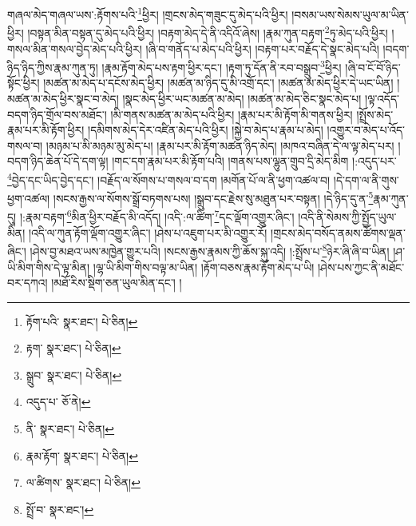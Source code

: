 གཞལ་མེད་གཞལ་ཡས་:རྟོགས་པའི་\footnote{རྟོག་པའི་  སྣར་ཐང་།  པེ་ཅིན། }ཕྱིར། །གྲངས་མེད་གཟུང་དུ་མེད་པའི་ཕྱིར། །བསམ་ཡས་སེམས་ཡུལ་མ་ཡིན་ཕྱིར། །བསྟན་མིན་བསྟན་དུ་མེད་པའི་ཕྱིར། །བརྟག་མེད་དེ་ནི་འདིའོ་ཞེས། །རྣམ་ཀུན་བརྟག་\footnote{རྟག་  སྣར་ཐང་།  པེ་ཅིན། }ཏུ་མེད་པའི་ཕྱིར། །གསལ་མིན་གསལ་བྱེད་མེད་པའི་ཕྱིར། །ཞི་བ་གནོད་པ་མེད་པའི་ཕྱིར། །བརྟག་པར་བརྗོད་དེ་སྣང་མེད་པའི། །བདག་ཉིད་ཉིད་ཀྱིས་རྣམ་ཀུན་ཏུ། །རྣམ་རྟོག་མེད་པས་རྟག་ཕྱིར་དང་། །རྟག་ཏུ་དོན་ནི་རབ་བསྒྲུབ་\footnote{སྒྲུབ་  སྣར་ཐང་།  པེ་ཅིན། }ཕྱིར། །ཞི་བ་ངོ་བོ་ཉིད་སྟོང་ཕྱིར། །མཚན་མ་མེད་པ་དངོས་མེད་ཕྱིར། །མཚན་མ་ཉིད་དུ་མི་འགྲོ་དང་། །མཚན་མ་མེད་ཕྱིར་དེ་ཡང་ཡིན། །མཚན་མ་མེད་ཕྱིར་སྣང་བ་མེད། །སྣང་མེད་ཕྱིར་ཡང་མཚན་མ་མེད། །མཚན་མ་མེད་ཅིང་སྣང་མེད་པ། །ལྟ་འདོད་བདག་ཉིད་གྲོལ་བས་མཐོང་། །མི་གནས་མཚན་མ་མེད་པའི་ཕྱིར། །རྣམ་པར་མི་རྟོག་མི་གནས་ཕྱིར། །སྤྲོས་མེད་རྣམ་པར་མི་རྟོག་ཕྱིར། །དམིགས་མེད་དེར་འཛིན་མེད་པའི་ཕྱིར། །སྐྱེ་བ་མེད་པ་རྣམ་པ་མེད། །འགྱུར་བ་མེད་པ་འོད་གསལ་བ། །མཉམ་པ་མི་མཉམ་མུ་མེད་པ། །རྣམ་པར་མི་རྟོག་མཚན་ཉིད་མེད། །མཁའ་བཞིན་དེ་ལ་ལྟ་མེད་པར། །བདག་ཉིད་ཆེན་པོ་དེ་དག་ལྟ། །གང་དག་རྣམ་པར་མི་རྟོག་པའི། །གནས་པས་ལྷུན་གྲུབ་དྲི་མེད་མིག །:འདུད་པར་\footnote{འདུད་པ་  ཅོ་ནེ། }བྱེད་དང་ཡིད་བྱེད་དང་། །བརྗོད་ལ་སོགས་པ་གསལ་བ་དག །མགོན་པོ་ལ་ནི་ཕྱག་འཚལ་བ། །དེ་དག་ལ་ནི་གུས་ཕྱག་འཚལ། །སངས་རྒྱས་ལ་སོགས་སྒྲོ་བཏགས་པས། །སྒྲུབ་དང་རྗེས་སུ་མཐུན་པར་བསྟན། །དེ་ཉིད་དུ་ན་\footnote{ནི་  སྣར་ཐང་།  པེ་ཅིན། }རྣམ་ཀུན་དུ། །:རྣམ་བརྟག་\footnote{རྣམ་རྟོག་  སྣར་ཐང་།  པེ་ཅིན། }མིན་ཕྱིར་བརྗོད་མི་འདོད། །འདི་:ལ་ཚིག་\footnote{ལ་ཚིགས་  སྣར་ཐང་།  པེ་ཅིན། }དང་ལྡོག་འགྱུར་ཞིང་། །འདི་ནི་སེམས་ཀྱི་སྤྱོད་ཡུལ་མིན། །འདི་ལ་ཀུན་རྟོག་ལྡོག་འགྱུར་ཞིང་། །ཤེས་པ་འཇུག་པར་མི་འགྱུར་རོ། །གྲངས་མེད་བསོད་ནམས་ཚོགས་ལྡན་ཞིང་། །ཤེས་བྱ་མཐའ་ཡས་མཁྱེན་གྱུར་པའི། །སངས་རྒྱས་རྣམས་ཀྱི་ཆོས་སྐུ་འདི། །:སྤྲོས་པ་\footnote{སྤྲོ་བ་  སྣར་ཐང་། }ཉེར་ཞི་ཞི་བ་ཡིན། །ཤ་ཡི་མིག་གིས་དེ་ལྟ་མིན། །ལྷ་ཡི་མིག་གིས་བལྟ་མ་ཡིན། །རྟོག་བཅས་རྣམ་རྟོག་མེད་པ་ཡི། །ཤེས་པས་ཀྱང་ནི་མཐོང་བར་དཀའ། །མཐོ་རིས་སྡིག་ཅན་ཡུལ་མིན་དང་། །
